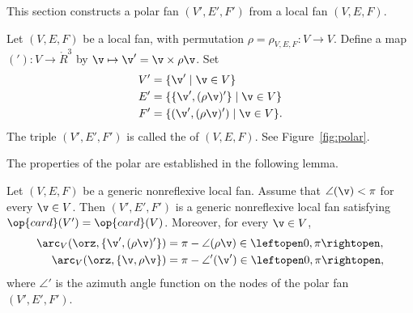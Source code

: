 This section constructs a polar fan $(V',E',F')$ from a local fan $(V,E,F)$.

\begin{definition}[polar]
  Let $(V,E,F)$ be a local fan, with permutation
  $\rho=\rho_{V,E,F}:V\to V$.  Define a map $('): V \to \ring{R}^3$ by
  $\v\mapsto\v' = \v\times\rho\v$.  Set
\begin{align*}
V' & = \{\v' \mid \v\in V\}\\
E' & = \{\{\v',(\rho\v)'\}\mid \v\in V\}\\
F' &=\{ (\v',(\rho\v)') \mid \v\in V\}.
\end{align*}
The triple $(V',E',F')$ is called the  of $(V,E,F)$.
See Figure~\ref{fig:polar}.
\end{definition}
%
%
%
%

\figHEABLRG %

The properties of the polar are established in the
following lemma.

\begin{lemma}\label{lemma:polar-fan}
  Let $(V,E,F)$ be a generic nonreflexive local fan. 
Assume that $\angle(\v)<\pi$ for every $\v\in V$.  Then $(V',E',F')$ is
a generic nonreflexive local fan satisfying $\op{card}(V')=\op{card}(V)$.
Moreover, for every $\v\in V$,
\begin{align*}
\arc_V(\orz,\{\v',(\rho\v)'\}) 
&= \pi - \angle(\rho\v) \in \leftopen 0,\pi\rightopen,\\
\arc_V(\orz,\{\v,\rho\v\}) 
&= \pi - \angle'(\v')\in\leftopen 0,\pi\rightopen,
\end{align*}
where $\angle'$ is the azimuth angle function on the nodes of the
polar fan $(V',E',F')$.
\end{lemma}


